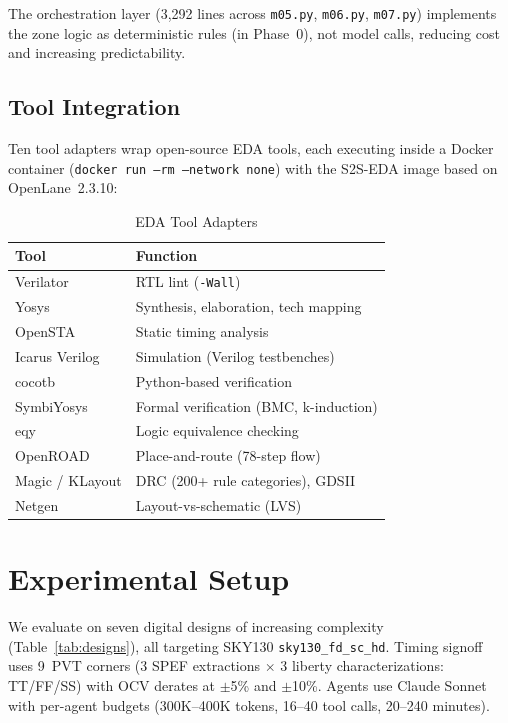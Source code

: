 \documentclass[journal]{IEEEtran}
\begin{document}
The orchestration layer (3,292 lines across \texttt{m05.py}, \texttt{m06.py}, \texttt{m07.py}) implements the zone logic as deterministic rules (in Phase~0), not model calls, reducing cost and increasing predictability.

\subsection{Tool Integration}

Ten tool adapters wrap open-source EDA tools, each executing inside a Docker container (\texttt{docker run --rm --network none}) with the S2S-EDA image based on OpenLane~2.3.10:

\begin{table}[t]
\centering
\caption{EDA Tool Adapters}
\label{tab:tools}
\begin{tabular}{@{}ll@{}}
\toprule
\textbf{Tool} & \textbf{Function} \\
\midrule
Verilator & RTL lint (\texttt{-Wall}) \\
Yosys & Synthesis, elaboration, tech mapping \\
OpenSTA & Static timing analysis \\
Icarus Verilog & Simulation (Verilog testbenches) \\
cocotb & Python-based verification \\
SymbiYosys & Formal verification (BMC, k-induction) \\
eqy & Logic equivalence checking \\
OpenROAD & Place-and-route (78-step flow) \\
Magic / KLayout & DRC (200+ rule categories), GDSII \\
Netgen & Layout-vs-schematic (LVS) \\
\bottomrule
\end{tabular}
\end{table}

\section{Experimental Setup}
\label{sec:setup}

We evaluate on seven digital designs of increasing complexity (Table~\ref{tab:designs}), all targeting SKY130 \texttt{sky130\_fd\_sc\_hd}. Timing signoff uses 9~PVT corners (3 SPEF extractions $\times$ 3 liberty characterizations: TT/FF/SS) with OCV derates at $\pm$5\% and $\pm$10\%. Agents use Claude Sonnet~\cite{anthropic2024claude} with per-agent budgets (300K--400K tokens, 16--40 tool calls, 20--240 minutes).
\end{document}
